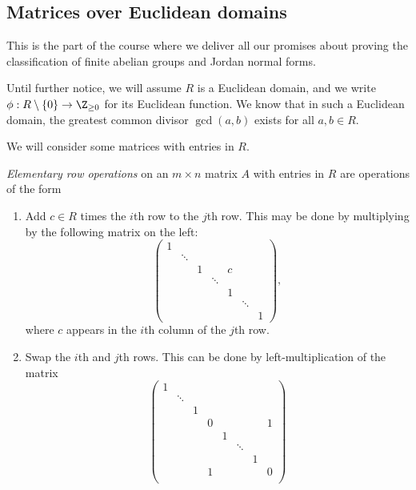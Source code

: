 \documentclass[a4paper]{article}
\begin{document}
\subsection{Matrices over Euclidean domains}
This is the part of the course where we deliver all our promises about proving the classification of finite abelian groups and Jordan normal forms.

Until further notice, we will assume $R$ is a Euclidean domain, and we write $\phi: R\setminus \{0\} \to \Z_{\geq 0}$ for its Euclidean function. We know that in such a Euclidean domain, the greatest common divisor $\gcd(a, b)$ exists for all $a, b \in R$.

We will consider some matrices with entries in $R$.

\begin{defi}
  \emph{Elementary row operations} on an $m \times n$ matrix $A$ with entries in $R$ are operations of the form
  \begin{enumerate}
    \item Add $c \in R$ times the $i$th row to the $j$th row. This may be done by multiplying by the following matrix on the left:
      \[
        \begin{pmatrix}
          1 \\
          & \ddots \\
          & & 1 & & c\\
          & & & \ddots\\
          & & & & 1\\
          & & & & & \ddots\\
          & & & & & & 1
        \end{pmatrix},
      \]
      where $c$ appears in the $i$th column of the $j$th row.
    \item Swap the $i$th and $j$th rows. This can be done by left-multiplication of the matrix
      \setcounter{MaxMatrixCols}{11}
      \[
        \begin{pmatrix}
          1\\
          & \ddots\\
          & & 1\\
          & & & 0 & & & & 1\\
          & & & & 1\\
          & & & & & \ddots\\
          & & & & & & 1\\
          & & & 1 & & & & 0\\

\end{pmatrix}\]
\end{enumerate}
\end{defi}
\end{document}
